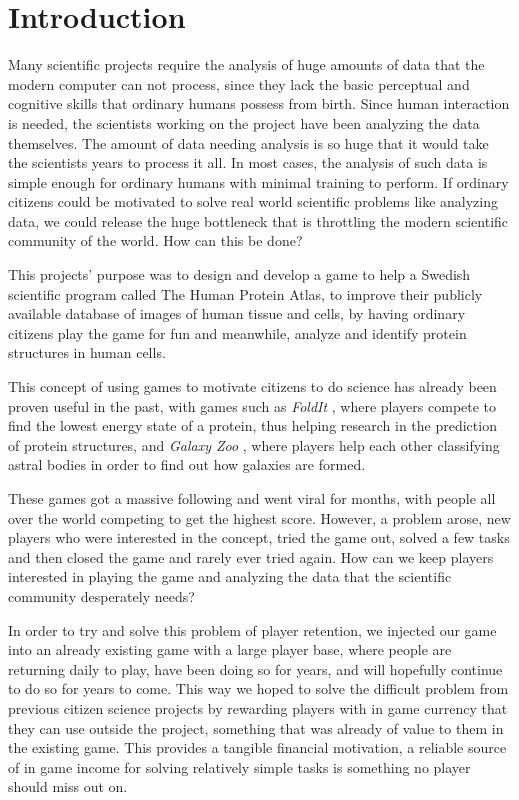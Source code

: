 \section{Introduction}\label{sec:introduction}

Many scientific projects require the analysis of huge amounts of data that the modern computer can not process, since they lack the basic perceptual and cognitive skills that ordinary humans possess from birth. Since human interaction is needed, the scientists working on the project have been analyzing the data themselves. 
The amount of data needing analysis is so huge that it would take the scientists years to process it all. In most cases, the analysis of such data is simple enough for ordinary humans with minimal training to perform. If ordinary citizens could be motivated to solve real world scientific problems like analyzing data, we could release the huge bottleneck that is throttling the modern scientific community of the world. How can this be done?

This projects' purpose was to design and develop a game to help a Swedish scientific program called The Human Protein Atlas, to improve their publicly available database of images of human tissue and cells, by having ordinary citizens play the game for fun and meanwhile, analyze and identify protein structures in human cells.

This concept of using games to motivate citizens to do science has already been proven useful in the past, with games such as \emph{FoldIt} \cite{foldit}, where players compete to find the lowest energy state of a protein, thus helping research in the prediction of protein structures, and \emph{Galaxy Zoo} \cite{galaxyzoo}, where players help each other classifying astral bodies in order to find out how galaxies are formed.

These games got a massive following and went viral for months, with people all over the world competing to get the highest score. However, a problem arose, new players who were interested in the concept, tried the game out, solved a few tasks and then closed the game and rarely ever tried again. How can we keep players interested in playing the game and analyzing the data that the scientific community desperately needs?

In order to try and solve this problem of player retention, we injected our game into an already existing game with a large player base, where people are returning daily to play, have been doing so for years, and will hopefully continue to do so for years to come. This way we hoped to solve the difficult problem from previous citizen science projects by rewarding players with in game currency that they can use outside the project, something that was already of value to them in the existing game. This provides a tangible financial motivation, a reliable source of in game income for solving relatively simple tasks is something no player should miss out on.

